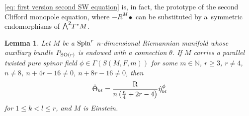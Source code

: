 \documentclass[pdftex]{sigma}
\newcommand{\ext}{\raise1pt\hbox{\small$\bigwedge$}}
\numberwithin{equation}{section}
\newtheorem{Lemma}[Theorem]{Lemma}
\begin{document}
\begin{Remark}\eqref{eq: first version second SW equation} is, in fact, the prototype of the second Clifford monopole equation,
where $-R^M\bullet$ can be substituted by a~symmetric endomorphisms of $\ext^2 T^*M$.
\end{Remark}

\begin{Lemma}\label{lemma: identity curvatures}Let $M$ be a ${\rm Spin}^r$ $n$-dimensional Riemannian manifold whose auxiliary bundle $P_{{\rm SO}(r)}$ is endowed with a connection $\theta$. If $M$ carries a parallel twisted pure spinor field $\phi\in\Gamma(S(M,F,m))$ for some $m\in\mathbb{N}$, $r\geq 3$, $r\not= 4$, $n\not=8$, $n+4r-16\not=0$, $n+8r-16\not=0$,
then
\begin{gather*}
\hat\Theta_{kl} = {{\rm R}\over n\left({n\over 4}+2r-4\right)}\hat\eta_{kl}^\phi
\end{gather*}
for $1\leq k<l\leq r$, and $M$ is Einstein.
\end{Lemma}
\end{document}
